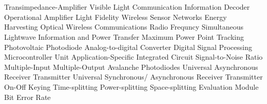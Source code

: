 \chapter{}
\begin{acronym}
     {Transimpedance-Amplifier}
     {Visible Light Communication}
     {Information Decoder}
      {Operational Amplifier}
      {Light Fidelity}
      {Wireless Sensor Networks}
      {Energy Harvesting}
      {Optical Wireless Communications}
      {Radio Frequncy}
      {Simultaneous Lightwave Information and Power Transfer}
      {Maximum Power Point Tracking}
      {Photovoltaic}
      {Photodiode}
      {Analog-to-digital Converter}
      {Digital Signal Processing}
      {Microcontroller Unit}
      {Application-Specific Integrated Circuit}
      {Signal-to-Noise Ratio}
      {Multiple-Input Multiple-Output}
      {Avalanche Photodiodes}
      {Universal Asynchronous Receiver Transmitter}
      {Universal Synchronous/ Asynchronous Receiver Transmitter}
      {On-Off Keying}
      {Time-splitting}
      {Power-splitting}
      {Space-splitting}
      {Evaluation Module}
      {Bit Error Rate}
\end{acronym}
